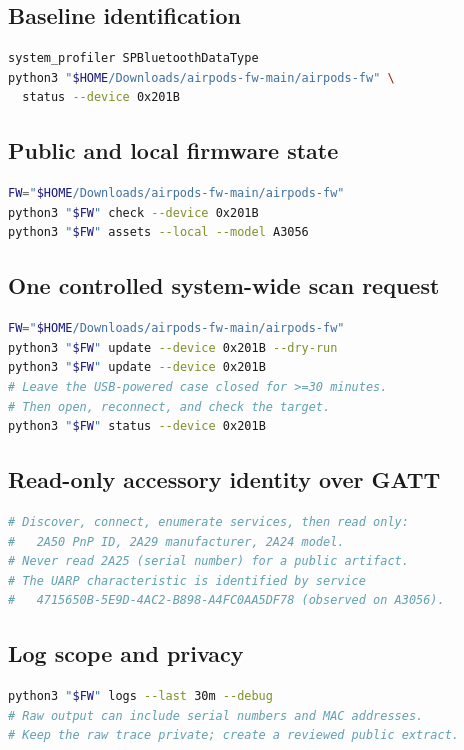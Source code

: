\documentclass[11pt,letterpaper]{article}
\begin{document}
\subsection{Baseline identification}
\begin{lstlisting}[language=bash]
system_profiler SPBluetoothDataType
python3 "$HOME/Downloads/airpods-fw-main/airpods-fw" \
  status --device 0x201B
\end{lstlisting}
\subsection{Public and local firmware state}
\begin{lstlisting}[language=bash]
FW="$HOME/Downloads/airpods-fw-main/airpods-fw"
python3 "$FW" check --device 0x201B
python3 "$FW" assets --local --model A3056
\end{lstlisting}
\subsection{One controlled system-wide scan request}
\begin{lstlisting}[language=bash]
FW="$HOME/Downloads/airpods-fw-main/airpods-fw"
python3 "$FW" update --device 0x201B --dry-run
python3 "$FW" update --device 0x201B
# Leave the USB-powered case closed for >=30 minutes.
# Then open, reconnect, and check the target.
python3 "$FW" status --device 0x201B
\end{lstlisting}
\subsection{Read-only accessory identity over GATT}
\begin{lstlisting}[language=bash]
# Discover, connect, enumerate services, then read only:
#   2A50 PnP ID, 2A29 manufacturer, 2A24 model.
# Never read 2A25 (serial number) for a public artifact.
# The UARP characteristic is identified by service
#   4715650B-5E9D-4AC2-B898-A4FC0AA5DF78 (observed on A3056).
\end{lstlisting}
\subsection{Log scope and privacy}
\begin{lstlisting}[language=bash]
python3 "$FW" logs --last 30m --debug
# Raw output can include serial numbers and MAC addresses.
# Keep the raw trace private; create a reviewed public extract.
\end{lstlisting}
\end{document}
